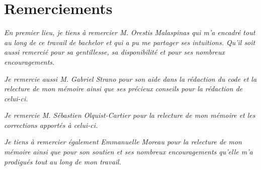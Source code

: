 \chapter*{Remerciements} %

\textit{En premier lieu, je tiens à remercier M. Orestis Malaspinas qui
m'a encadré tout au long de ce travail de bachelor et qui a pu me partager ses
intuitions. Qu'il soit aussi remercié pour sa gentillesse, sa disponibilité et
pour ses nombreux encouragements.}

\textit{Je remercie aussi M. Gabriel Strano pour son aide dans la rédaction du
	code et	la relecture de mon mémoire ainsi que ses précieux conseils pour la
rédaction de celui-ci.}

\textit{Je remercie M. Sébastien Olquist-Cartier pour la relecture de mon
	mémoire et les corrections apportés à celui-ci.}

\textit{Je tiens à remercier également Emmanuelle Moreau pour la 
	relecture de mon mémoire ainsi que pour son soutien et ses nombreux 
	encouragements qu'elle m'a prodigués tout au long de mon travail.}


